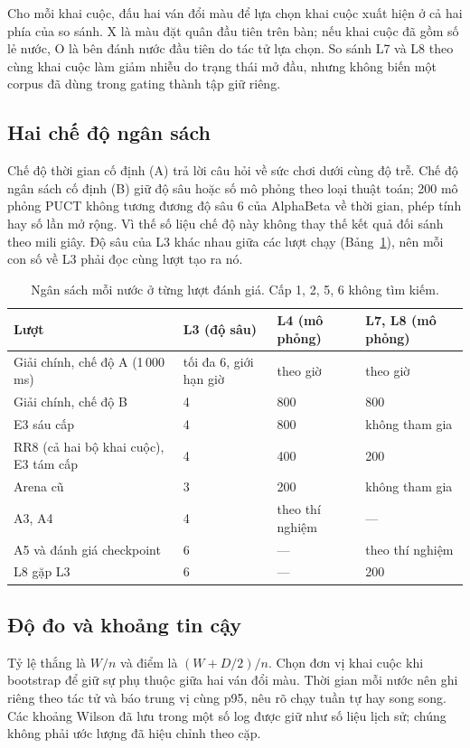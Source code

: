 Cho mỗi khai cuộc, đấu hai ván đổi màu để lựa chọn khai cuộc xuất hiện ở cả hai phía của so sánh. X là màu đặt quân đầu tiên trên bàn; nếu khai cuộc đã gồm số lẻ nước, O là bên đánh nước đầu tiên do tác tử lựa chọn. So sánh L7 và L8 theo cùng khai cuộc làm giảm nhiễu do trạng thái mở đầu, nhưng không biến một corpus đã dùng trong gating thành tập giữ riêng.
\subsection{Hai chế độ ngân sách}
Chế độ thời gian cố định (A) trả lời câu hỏi về sức chơi dưới cùng độ trễ. Chế độ ngân sách cố định (B) giữ độ sâu hoặc số mô phỏng theo loại thuật toán; 200 mô phỏng PUCT không tương đương độ sâu 6 của AlphaBeta về thời gian, phép tính hay số lần mở rộng. Vì thế số liệu chế độ này không thay thế kết quả đối sánh theo mili giây. Độ sâu của L3 khác nhau giữa các lượt chạy (Bảng~\ref{tab:ngan-sach}), nên mỗi con số về L3 phải đọc cùng lượt tạo ra nó.

\begin{table}[H]
  \centering\small
  \caption{Ngân sách mỗi nước ở từng lượt đánh giá. Cấp 1, 2, 5, 6 không tìm kiếm.}
  \label{tab:ngan-sach}
  \begin{tabularx}{\textwidth}{@{}X l l l@{}}
    \toprule
    \textbf{Lượt} & \textbf{L3 (độ sâu)} & \textbf{L4 (mô phỏng)} & \textbf{L7, L8 (mô phỏng)} \\
    \midrule
    Giải chính, chế độ A (1\,000 ms) & tối đa 6, giới hạn giờ & theo giờ & theo giờ \\
    Giải chính, chế độ B & 4 & 800 & 800 \\
    E3 sáu cấp & 4 & 800 & không tham gia \\
    RR8 (cả hai bộ khai cuộc), E3 tám cấp & 4 & 400 & 200 \\
    Arena cũ & 3 & 200 & không tham gia \\
    A3, A4 & 4 & theo thí nghiệm & --- \\
    A5 và đánh giá checkpoint & 6 & --- & theo thí nghiệm \\
    L8 gặp L3 & 6 & --- & 200 \\
    \bottomrule
  \end{tabularx}
\end{table}
\subsection{Độ đo và khoảng tin cậy}
Tỷ lệ thắng là $W/n$ và điểm là $(W+D/2)/n$. Chọn đơn vị khai cuộc khi bootstrap để giữ sự phụ thuộc giữa hai ván đổi màu. Thời gian mỗi nước nên ghi riêng theo tác tử và báo trung vị cùng p95, nêu rõ chạy tuần tự hay song song. Các khoảng Wilson đã lưu trong một số log được giữ như số liệu lịch sử; chúng không phải ước lượng đã hiệu chỉnh theo cặp.
